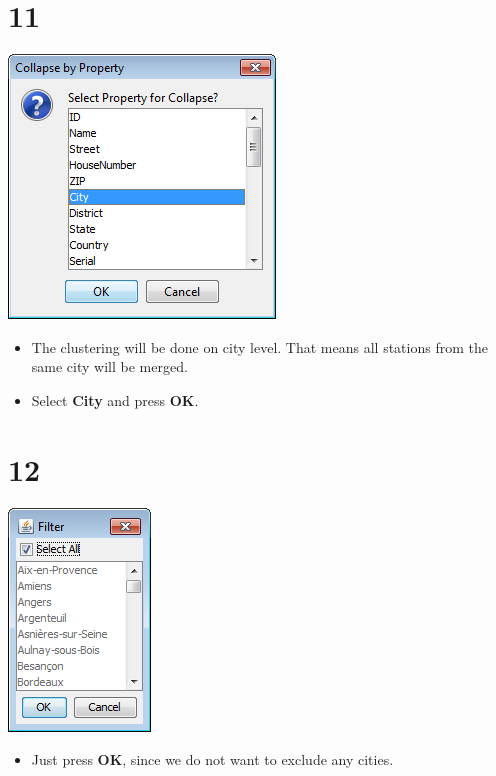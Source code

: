 \documentclass{beamer}
\begin{document}
\section{11}
\begin{frame}
	\begin{center}
  		\includegraphics[height=0.5\textheight]{11.png}
	\end{center}
	\begin{itemize}
		\item The clustering will be done on city level. That means all stations from the same city will be merged.
		\item Select \textbf{City} and press \textbf{OK}.
	\end{itemize}
\end{frame}

\section{12}
\begin{frame}
	\begin{center}
  		\includegraphics[height=0.5\textheight]{12.png}
	\end{center}
	\begin{itemize}
		\item Just press \textbf{OK}, since we do not want to exclude any cities.
	\end{itemize}
\end{frame}
\end{document}
